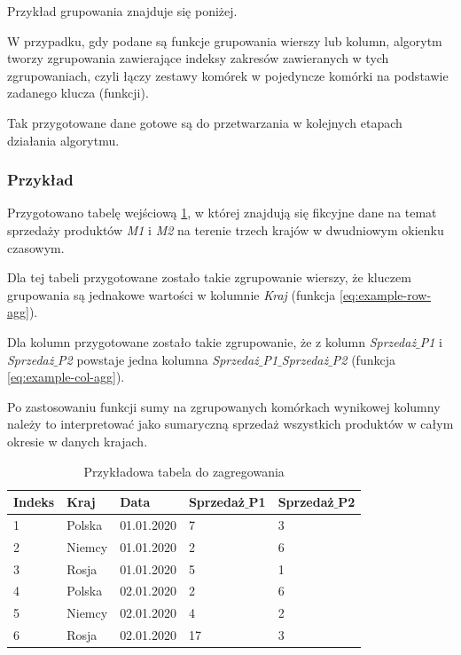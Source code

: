 \documentclass[brudnopis]{xmgr}
\begin{document}
Przykład grupowania znajduje się poniżej.
\medskip

W przypadku, gdy podane są funkcje grupowania wierszy lub kolumn, algorytm tworzy zgrupowania zawierające indeksy zakresów zawieranych w tych zgrupowaniach, czyli łączy zestawy komórek w pojedyncze komórki na podstawie zadanego klucza (funkcji).
\medskip

Tak przygotowane dane gotowe są do przetwarzania w kolejnych etapach działania algorytmu.

\subsubsection{Przykład}
\medskip

Przygotowano tabelę wejściową \ref{tab:example-input}, w której znajdują się fikcyjne dane na temat sprzedaży produktów \emph{M1} i \emph{M2} na terenie trzech krajów w dwudniowym okienku czasowym.
\medskip

Dla tej tabeli przygotowane zostało takie zgrupowanie wierszy, że kluczem grupowania są jednakowe wartości w kolumnie \emph{Kraj} (funkcja \ref{eq:example-row-agg}).
\medskip

Dla kolumn przygotowane zostało takie zgrupowanie, że z kolumn \emph{Sprzedaż$\_$P1} i \emph{Sprzedaż$\_$P2} powstaje jedna kolumna \emph{Sprzedaż$\_$P1$\_$Sprzedaż$\_$P2} (funkcja \ref{eq:example-col-agg}).
\medskip

Po zastosowaniu funkcji sumy na zgrupowanych komórkach wynikowej kolumny należy to interpretować jako sumaryczną sprzedaż wszystkich produktów w całym okresie w danych krajach.

\begin{table}[!tbh]
\begin{tabular}{|l|l|l|l|l|} \hline
Indeks & Kraj & Data & Sprzedaż$\_$P1 & Sprzedaż$\_$P2 \\ \hline
1 & Polska & 01.01.2020 & 7 & 3 \\ \hline
2 & Niemcy & 01.01.2020 & 2 & 6 \\ \hline
3 & Rosja & 01.01.2020 & 5 & 1 \\ \hline
4 & Polska & 02.01.2020 & 2 & 6 \\ \hline
5 & Niemcy & 02.01.2020 & 4 & 2 \\ \hline
6 & Rosja & 02.01.2020 & 17 & 3 \\ \hline
\end{tabular}
\caption{Przykładowa tabela do zagregowania \label{tab:example-input}}
\end{table}
\medskip
\end{document}
